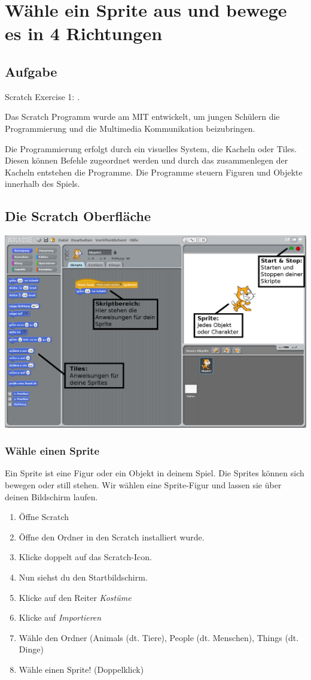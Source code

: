 \section{Wähle ein Sprite aus und bewege es in 4 Richtungen}
\subsection{Aufgabe}
Scratch Exercise 1: .

Das Scratch Programm wurde am MIT entwickelt, um jungen Schülern die Programmierung und die Multimedia Kommunikation beizubringen. 

Die Programmierung erfolgt durch ein visuelles System, die Kacheln oder Tiles. Diesen können Befehle zugeordnet werden und durch das zusammenlegen der Kacheln entstehen die Programme. Die Programme steuern Figuren und Objekte innerhalb des Spiels.


\subsection{Die Scratch Oberfläche}
\includegraphics[width=\textwidth]{images/example1_overview.png}

\subsubsection{Wähle einen Sprite}

Ein Sprite ist eine Figur oder ein Objekt in deinem Spiel. Die Sprites können sich bewegen oder still stehen. Wir wählen eine Sprite-Figur und lassen sie über deinen Bildschirm laufen.
\begin{enumerate}
\item Öffne Scratch
\item Öffne den Ordner in den Scratch installiert wurde.
\item Klicke doppelt auf das Scratch-Icon.
\item Nun siehst du den Startbildschirm.
\item Klicke auf den Reiter \textit{Kostüme}
\item Klicke auf \textit{Importieren}
\item Wähle den Ordner (Animals (dt. Tiere), People (dt. Menschen), Things (dt. Dinge)
\item Wähle einen  Sprite! (Doppelklick)
\end{enumerate}

